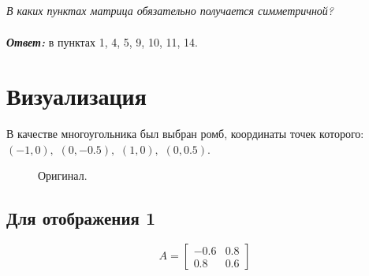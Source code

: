 \documentclass[a5paper, 10pt]{article}
\theoremstyle{definition}
\theoremstyle{plain}
\theoremstyle{remark}
\begin{document}
\subsection{}
\textit{В каких пунктах матрица обязательно получается симметричной?}\\
\\
\textbf{\textit{Ответ:}} в пунктах 1, 4, 5, 9, 10, 11, 14.





\newpage
\section{Визуализация}
В качестве многоугольника был выбран ромб, координаты точек которого: $(-1, 0), \, \, (0, -0.5), \, \, (1, 0), \, \, (0, 0.5).$

\begin{figure}[h]
\caption{Оригинал.}
\end{figure}

\newpage
\subsection{Для отображения 1}
\begin{equation}
A =
\begin{bmatrix}
-0.6 & 0.8\\
0.8 & 0.6
\end{bmatrix}
\end{equation}
\end{document}
